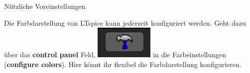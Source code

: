 \documentclass{beamer}
\begin{document}
\begin{frame}[fragile]{Nützliche Voreinstellungen}

  Die Farbdarstellung von LTspice kann jederzeit konfiguriert werden. Geht dazu über das
  \textbf{control panel} Feld, \includegraphics[scale=0.5]{pictures/controlpanel.png} in die Farbeinstellungen
  (\textbf{configure colors}). Hier könnt ihr flexibel die Farbdarstellung konfigurieren.

  \begin{figure}
    \centering
    \qquad
  \end{figure}

\end{frame}
\end{document}
